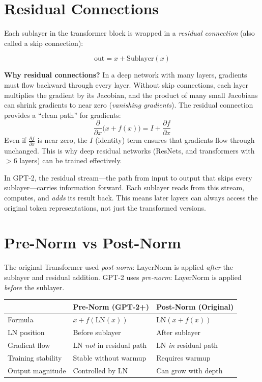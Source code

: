 \section{Residual Connections}

Each sublayer in the transformer block is wrapped in a \emph{residual connection}
(also called a skip connection):

\[
  \text{out} = x + \text{Sublayer}(x)
\]

\begin{keyconcept}
  \textbf{Why residual connections?} In a deep network with many layers,
  gradients must flow backward through every layer. Without skip connections,
  each layer multiplies the gradient by its Jacobian, and the product of many
  small Jacobians can shrink gradients to near zero (\emph{vanishing gradients}).
  The residual connection provides a ``clean path'' for gradients:
  \[
    \frac{\partial}{\partial x}\bigl(x + f(x)\bigr) = I + \frac{\partial f}{\partial x}
  \]
  Even if $\frac{\partial f}{\partial x}$ is near zero, the $I$ (identity)
  term ensures that gradients flow through unchanged. This is why deep
  residual networks (ResNets, and transformers with $>$6 layers) can be
  trained effectively.

  In GPT-2, the residual stream---the path from input to output that skips
  every sublayer---carries information forward. Each sublayer reads from this
  stream, computes, and \emph{adds} its result back. This means later layers
  can always access the original token representations, not just the
  transformed versions.
\end{keyconcept}

\section{Pre-Norm vs Post-Norm}

The original Transformer used \emph{post-norm}: LayerNorm is applied
\emph{after} the sublayer and residual addition. GPT-2 uses \emph{pre-norm}:
LayerNorm is applied \emph{before} the sublayer.

\begin{center}
\begin{tabular}{lll}
\toprule
 & \textbf{Pre-Norm (GPT-2+)} & \textbf{Post-Norm (Original)} \\
\midrule
Formula & $x + f(\text{LN}(x))$ & $\text{LN}(x + f(x))$ \\
LN position & Before sublayer & After sublayer \\
Gradient flow & LN \emph{not} in residual path & LN \emph{in} residual path \\
Training stability & Stable without warmup & Requires warmup \\
Output magnitude & Controlled by LN & Can grow with depth \\
\bottomrule
\end{tabular}
\end{center}

